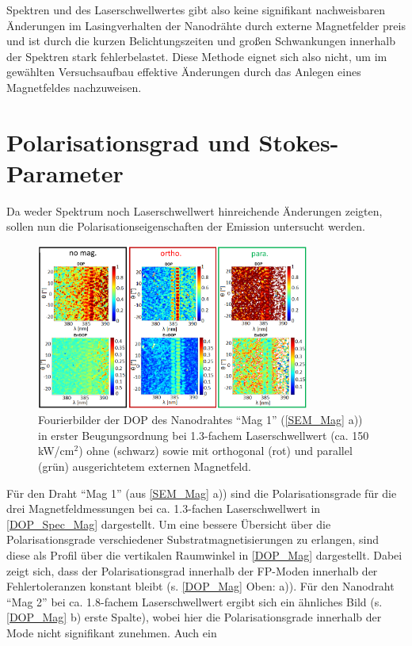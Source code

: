 Spektren und des Laserschwellwertes gibt also keine signifikant nachweisbaren
Änderungen  im Lasingverhalten der Nanodrähte durch externe Magnetfelder preis
und ist durch die kurzen Belichtungszeiten und großen Schwankungen innerhalb der
Spektren stark fehlerbelastet. Diese Methode eignet sich also nicht, um im
gewählten Versuchsaufbau effektive Änderungen durch das Anlegen eines
Magnetfeldes nachzuweisen. \section{Polarisationsgrad und Stokes-Parameter} Da
weder Spektrum noch Laserschwellwert hinreichende Änderungen zeigten, sollen nun
die Polarisationseigenschaften der Emission untersucht werden.\begin{figure}[b]
\centering \includegraphics[width=0.8\textwidth]{Bilder/Mag/DOP_Spec_Mag}
\caption{Fourierbilder der DOP des Nanodrahtes ``Mag 1'' (\autoref{SEM_Mag} a))
in erster Beugungsordnung bei 1.3-fachem Laserschwellwert (ca. 150
kW/cm$^\text{2}$) ohne (schwarz) sowie mit orthogonal (rot) und parallel (grün)
ausgerichtetem externen Magnetfeld.} \label{DOP_Spec_Mag} \end{figure} Für den
Draht ``Mag 1'' (aus \autoref{SEM_Mag} a)) sind die Polarisationsgrade für die
drei Magnetfeldmessungen bei ca. 1.3-fachen Laserschwellwert in
\autoref{DOP_Spec_Mag} dargestellt. Um eine bessere Übersicht über die
Polarisationsgrade verschiedener Substratmagnetisierungen zu erlangen, sind
diese als Profil über die vertikalen Raumwinkel in \autoref{DOP_Mag}
dargestellt. Dabei zeigt sich, dass der Polarisationsgrad innerhalb der FP-Moden
innerhalb der Fehlertoleranzen konstant bleibt (s. \autoref{DOP_Mag} Oben: a)).
Für den Nanodraht ``Mag 2'' bei ca. 1.8-fachem Laserschwellwert ergibt sich ein
ähnliches Bild (s. \autoref{DOP_Mag} b) erste Spalte), wobei hier die
Polarisationsgrade innerhalb der Mode nicht signifikant zunehmen. Auch ein
